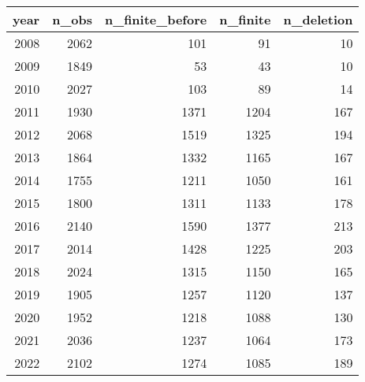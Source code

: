 \begin{tabular}{rrrrr}
\toprule
year & n\_obs & n\_finite\_before & n\_finite & n\_deletion \\
\midrule
2008 & 2062 & 101 & 91 & 10 \\
2009 & 1849 & 53 & 43 & 10 \\
2010 & 2027 & 103 & 89 & 14 \\
2011 & 1930 & 1371 & 1204 & 167 \\
2012 & 2068 & 1519 & 1325 & 194 \\
2013 & 1864 & 1332 & 1165 & 167 \\
2014 & 1755 & 1211 & 1050 & 161 \\
2015 & 1800 & 1311 & 1133 & 178 \\
2016 & 2140 & 1590 & 1377 & 213 \\
2017 & 2014 & 1428 & 1225 & 203 \\
2018 & 2024 & 1315 & 1150 & 165 \\
2019 & 1905 & 1257 & 1120 & 137 \\
2020 & 1952 & 1218 & 1088 & 130 \\
2021 & 2036 & 1237 & 1064 & 173 \\
2022 & 2102 & 1274 & 1085 & 189 \\
\bottomrule
\end{tabular}
